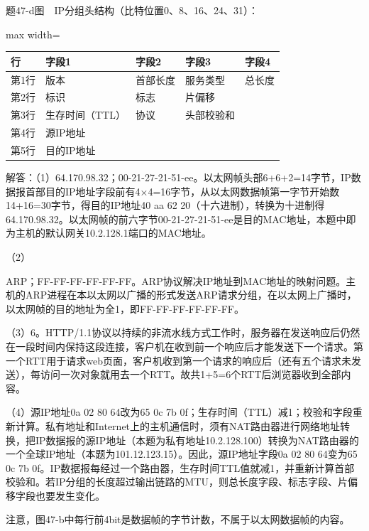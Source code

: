 \documentclass[UTF8,11pt]{ctexart}
\begin{document}
题47-d图　IP分组头结构（比特位置0、8、16、24、31）：


\begin{center}\begin{adjustbox}{max width=\linewidth}\begin{tabular}{|>{\raggedright\arraybackslash}p{\dimexpr(\linewidth-10\tabcolsep-6\arrayrulewidth)/5\relax}|>{\raggedright\arraybackslash}p{\dimexpr(\linewidth-10\tabcolsep-6\arrayrulewidth)/5\relax}|>{\raggedright\arraybackslash}p{\dimexpr(\linewidth-10\tabcolsep-6\arrayrulewidth)/5\relax}|>{\raggedright\arraybackslash}p{\dimexpr(\linewidth-10\tabcolsep-6\arrayrulewidth)/5\relax}|>{\raggedright\arraybackslash}p{\dimexpr(\linewidth-10\tabcolsep-6\arrayrulewidth)/5\relax}|}\hline
行 & 字段1 & 字段2 & 字段3 & 字段4\\\hline
第1行 & 版本 & 首部长度 & 服务类型 & 总长度\\\hline
第2行 & 标识 & 标志 & 片偏移 & \\\hline
第3行 & 生存时间（TTL） & 协议 & 头部校验和 & \\\hline
第4行 & 源IP地址 &  &  & \\\hline
第5行 & 目的IP地址 &  &  & \\\hline\end{tabular}\end{adjustbox}\end{center}

解答：（1）64.170.98.32；00-21-27-21-51-ee。以太网帧头部6+6+2=14字节，IP数据报首部目的IP地址字段前有4×4=16字节，从以太网数据帧第一字节开始数14+16=30字节，得目的IP地址40 aa 62 20（十六进制），转换为十进制得64.170.98.32。以太网帧的前六字节00-21-27-21-51-ee是目的MAC地址，本题中即为主机的默认网关10.2.128.1端口的MAC地址。


（2）


ARP；FF-FF-FF-FF-FF-FF。ARP协议解决IP地址到MAC地址的映射问题。主机的ARP进程在本以太网以广播的形式发送ARP请求分组，在以太网上广播时，以太网帧的目的地址为全1，即FF-FF-FF-FF-FF-FF。


（3）6。HTTP/1.1协议以持续的非流水线方式工作时，服务器在发送响应后仍然在一段时间内保持这段连接，客户机在收到前一个响应后才能发送下一个请求。第一个RTT用于请求web页面，客户机收到第一个请求的响应后（还有五个请求未发送），每访问一次对象就用去一个RTT。故共1+5=6个RTT后浏览器收到全部内容。


（4）源IP地址0a 02 80 64改为65 0c 7b 0f；生存时间（TTL）减1；校验和字段重新计算。私有地址和Internet上的主机通信时，须有NAT路由器进行网络地址转换，把IP数据报的源IP地址（本题为私有地址10.2.128.100）转换为NAT路由器的一个全球IP地址（本题为101.12.123.15）。因此，源IP地址字段0a 02 80 64变为65 0c 7b 0f。IP数据报每经过一个路由器，生存时间TTL值就减1，并重新计算首部校验和。若IP分组的长度超过输出链路的MTU，则总长度字段、标志字段、片偏移字段也要发生变化。


注意，图47-b中每行前4bit是数据帧的字节计数，不属于以太网数据帧的内容。
\end{document}
